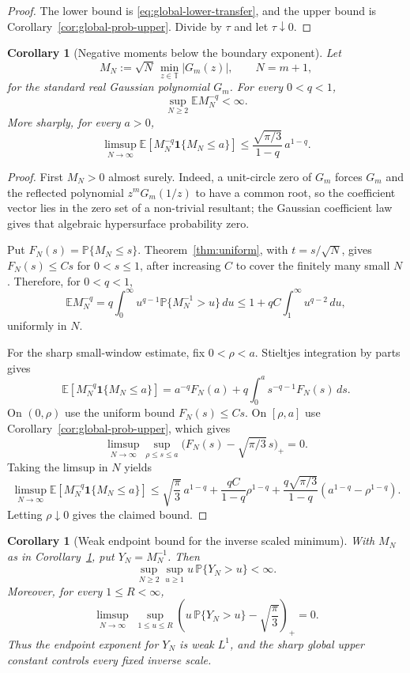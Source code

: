 \documentclass[11pt]{amsart}
\numberwithin{equation}{section}
\newtheorem{corollary}[theorem]{Corollary}
\theoremstyle{definition}
\theoremstyle{remark}
\newcommand{\T}{\mathbb T}
\newcommand{\Prob}{\mathbb P}
\newcommand{\Exp}{\mathbb E}
\begin{document}
\begin{proof}
The lower bound is \eqref{eq:global-lower-transfer}, and the upper bound is
Corollary~\ref{cor:global-prob-upper}.  Divide by \(\tau\) and let
\(\tau\downarrow0\).
\end{proof}

\begin{corollary}[Negative moments below the boundary exponent]
\label{cor:global-negative-moments}
Let
\[
  M_N:=\sqrt N\,\min_{z\in\T}|G_m(z)|,\qquad N=m+1,
\]
for the standard real Gaussian polynomial \(G_m\).  For every \(0<q<1\),
\[
  \sup_{N\ge2}\Exp M_N^{-q}<\infty .
\]
More sharply, for every \(a>0\),
\[
  \limsup_{N\to\infty}
  \Exp\!\left[M_N^{-q}\mathbf1\{M_N\le a\}\right]
  \le
  \frac{\sqrt{\pi/3}}{1-q}\,a^{1-q}.
\]
\end{corollary}

\begin{proof}
First \(M_N>0\) almost surely.  Indeed, a unit-circle zero of \(G_m\) forces
\(G_m\) and the reflected polynomial \(z^mG_m(1/z)\) to have a common root, so
the coefficient vector lies in the zero set of a non-trivial resultant; the
Gaussian coefficient law gives that algebraic hypersurface probability zero.

Put \(F_N(s)=\Prob\{M_N\le s\}\).  Theorem~\ref{thm:uniform}, with
\(t=s/\sqrt N\), gives \(F_N(s)\le C s\) for \(0<s\le1\), after increasing
\(C\) to cover the finitely many small \(N\).  Therefore, for \(0<q<1\),
\[
  \Exp M_N^{-q}
  =
  q\int_0^\infty u^{q-1}\Prob\{M_N^{-1}>u\}\,du
  \le
  1+qC\int_1^\infty u^{q-2}\,du,
\]
uniformly in \(N\).

For the sharp small-window estimate, fix \(0<\rho<a\).  Stieltjes integration
by parts gives
\[
  \Exp\!\left[M_N^{-q}\mathbf1\{M_N\le a\}\right]
  =
  a^{-q}F_N(a)+q\int_0^a s^{-q-1}F_N(s)\,ds .
\]
On \((0,\rho)\) use the uniform bound \(F_N(s)\le Cs\).  On \([\rho,a]\) use
Corollary~\ref{cor:global-prob-upper}, which gives
\[
  \limsup_{N\to\infty}\sup_{\rho\le s\le a}
  \bigl(F_N(s)-\sqrt{\pi/3}\,s\bigr)_+=0 .
\]
Taking the limsup in \(N\) yields
\[
  \limsup_{N\to\infty}
  \Exp\!\left[M_N^{-q}\mathbf1\{M_N\le a\}\right]
  \le
  \sqrt{\frac{\pi}{3}}\,a^{1-q}
  +\frac{qC}{1-q}\rho^{1-q}
  +\frac{q\sqrt{\pi/3}}{1-q}\left(a^{1-q}-\rho^{1-q}\right).
\]
Letting \(\rho\downarrow0\) gives the claimed bound.
\end{proof}

\begin{corollary}[Weak endpoint bound for the inverse scaled minimum]
\label{cor:global-inverse-weak}
With \(M_N\) as in Corollary~\ref{cor:global-negative-moments}, put
\(Y_N=M_N^{-1}\).  Then
\[
  \sup_{N\ge2}\sup_{u\ge1}
  u\,\Prob\{Y_N>u\}<\infty .
\]
Moreover, for every \(1\le R<\infty\),
\[
  \limsup_{N\to\infty}\;
  \sup_{1\le u\le R}
  \left(
    u\,\Prob\{Y_N>u\}-\sqrt{\frac{\pi}{3}}
  \right)_+
  =0 .
\]
Thus the endpoint exponent for \(Y_N\) is weak \(L^1\), and the sharp global
upper constant controls every fixed inverse scale.
\end{corollary}
\end{document}
